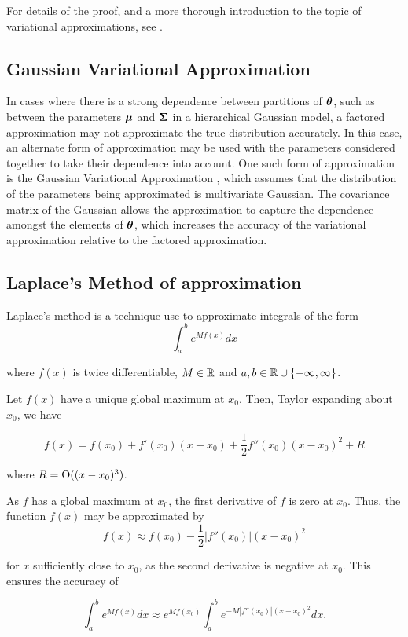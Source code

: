 \documentclass{amsart}[12pt]
\begin{document}
For details of the proof, and a more thorough introduction to the topic of variational approximations, see
\cite{Ormerod2010}.

\subsection{Gaussian Variational Approximation}

In cases where there is a strong dependence between partitions of ${\boldsymbol \theta}$, such as between the parameters
${\boldsymbol \mu}$ and ${\boldsymbol \Sigma}$ in a hierarchical Gaussian model, a factored approximation may not approximate the true
distribution accurately. In this case, an alternate form of approximation may be used with the parameters
considered together to take their dependence into account. One such form of approximation is the Gaussian
Variational Approximation \cite{Ormerod2012}, which assumes that the distribution of the parameters being 
approximated is multivariate Gaussian. The covariance matrix of the Gaussian allows the approximation to
capture the dependence amongst the elements of ${\boldsymbol \theta}$, which increases the accuracy of the variational
approximation relative to the factored approximation.

\subsection{Laplace's Method of approximation}

Laplace's method is a technique use to approximate integrals of the form
\[
	\int_a^b e^{M f(x)} dx
\]

where $f(x)$ is twice differentiable, $M \in {\mathbb{R}}$ and $a, b \in {\mathbb{R}} \cup \{-\infty, \infty\}$.

Let $f(x)$ have a unique global maximum at $x_0$. Then, Taylor expanding about $x_0$, we have

\[
	f(x) = f(x_0) + f'(x_0) (x - x_0) + \frac{1}{2} f''(x_0) (x - x_0)^2 + R
\]

where $R = \text{O}((x - x_0)^3)$.

As $f$ has a global maximum at $x_0$, the first derivative of $f$ is zero at $x_0$. Thus, the function $f(x)$
may be approximated by
\[
	f(x) \approx f(x_0) - \frac{1}{2} |f''(x_0)| (x - x_0)^2
\]

for $x$ sufficiently close to $x_0$, as the second derivative is negative at $x_0$. This ensures the
accuracy of

\[
	\int_a^b e^{M f(x)} dx \approx e^{M f(x_0)} \int_a^b e^{-M |f''(x_0)|(x - x_0)^2} dx.
\]
\end{document}
